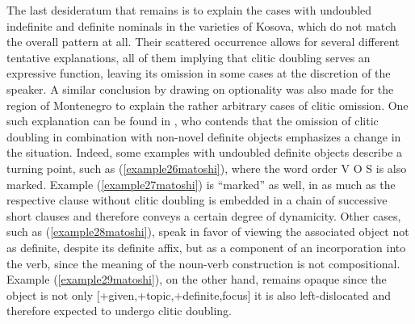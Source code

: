 \documentclass[output=paper]{langsci/langscibook}
\begin{document}
The last desideratum that remains is to explain the cases with undoubled indefinite and definite nominals in the  varieties of Kosova, which do not match the overall pattern at all. Their scattered occurrence allows for several different tentative explanations, all of them implying that clitic doubling serves an expressive function, leaving its omission in some cases at the discretion of the speaker. A similar conclusion by drawing on optionality was also made for the region of Montenegro to explain the rather arbitrary cases of clitic omission. One such explanation can be found in \citet[192--193]{Buchholz1977}, who contends that the omission of clitic doubling in combination with non-novel definite objects emphasizes a change in the situation. Indeed, some examples with undoubled definite objects describe a turning point, such as (\ref{example26matoshi}), where the word order V O S is also marked. Example (\ref{example27matoshi}) is \enquote{marked} as well, in as much as the respective clause without clitic doubling is embedded in a chain of successive short clauses and therefore conveys a certain degree of dynamicity. Other cases, such as (\ref{example28matoshi}), speak in favor of viewing the associated object not as definite, despite its definite affix, but as a component of an incorporation into the verb, since the meaning of the noun-verb construction is not compositional. Example (\ref{example29matoshi}), on the other hand, remains opaque since the object is not only [+given,+topic,+definite,\textminus{}focus] it is also left-dislocated and therefore expected to undergo clitic doubling. 
 
\end{document}

